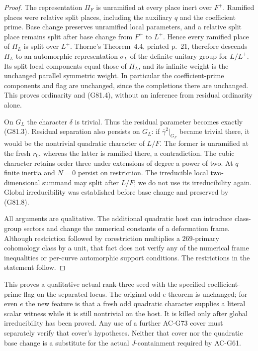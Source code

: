 \begin{proof}
The representation \(\Pi_F\) is unramified at every place
inert over \(F^+\).  Ramified places were relative split
places, including the auxiliary \(q\) and the coefficient
prime.  Base change preserves unramified local parameters,
and a relative split place remains split after base change
from \(F^+\) to \(L^+\).  Hence every ramified place of
\(\Pi_L\) is split over \(L^+\).
Thorne's Theorem~4.4, printed p.~21, therefore descends
\(\Pi_L\) to an automorphic representation \(\sigma_L\) of
the definite unitary group for \(L/L^+\).
Its split local components equal those of \(\Pi_L\), and its
infinite weight is the unchanged parallel symmetric weight.
In particular the coefficient-prime components and flag
are unchanged, since the completions there are unchanged.
This proves ordinarity and (G81.4), without an inference
from residual ordinarity alone.

On \(G_L\) the character \(\delta\) is trivial.
Thus the residual parameter becomes exactly (G81.3).
Residual separation also persists on \(G_L\): if
\(\overline\gamma^2|_{G_F}\) became trivial there, it would
be the nontrivial quadratic character of \(L/F\).
The former is unramified at the fresh \(r_0\), whereas the
latter is ramified there, a contradiction.
The cubic character retains order three under extensions
of degree a power of two.
At \(q\) finite inertia and \(N=0\) persist on restriction.
The irreducible local two-dimensional summand may split
after \(L/F\); we do not use its irreducibility again.
Global irreducibility was established before base change
and preserved by (G81.8).

All arguments are qualitative.  The additional quadratic
host can introduce class-group sectors and change the
numerical constants of a deformation frame.  Although
restriction followed by corestriction multiplies a
\(269\)-primary cohomology class by a unit, that fact does
not verify any of the numerical frame inequalities or
per-curve automorphic support conditions.
The restrictions in the statement follow.
\end{proof}

\begin{remark}
This proves a qualitative actual rank-three seed with the
specified coefficient-prime flag on the separated locus.
The original odd-\(e\) theorem is unchanged; for even \(e\)
the new feature is that a fresh odd quadratic character
supplies a literal scalar witness while it is still
nontrivial on the host.
It is killed only after global irreducibility has been
proved.  Any use of a further AC-G73 cover must separately
verify that cover's hypotheses.  Neither that cover nor
the quadratic base change is a substitute for the actual
\(J\)-containment required by AC-G61.
\end{remark}
